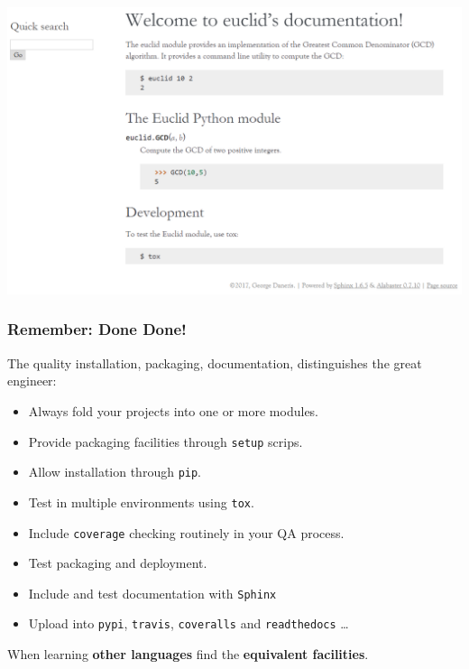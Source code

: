 \documentclass{beamer} %
\newcommand\emc[1]{\textcolor{brightblue}{\textbf{#1}}}
\begin{document}
\begin{frame}

\begin{center}
\includegraphics[scale=0.5]{assets/docs}
\end{center}

\end{frame}


\begin{frame}

\frametitle{Remember: Done Done!}

The quality installation, packaging, documentation, distinguishes the great engineer:
\begin{itemize}
  \item Always fold your projects into one or more modules.
  \item Provide packaging facilities through \texttt{setup} scrips.
  \item Allow installation through \texttt{pip}.
  \item Test in multiple environments using \texttt{tox}.
  \item Include \texttt{coverage} checking routinely in your QA process.
  \item Test packaging and deployment.
  \item Include and test documentation with \texttt{Sphinx}
  \item Upload into \texttt{pypi}, \texttt{travis}, \texttt{coveralls} and \texttt{readthedocs} \ldots
\end{itemize}

\vspace{3mm}
When learning \emc{other languages} find the \emc{equivalent facilities}.

\end{frame}
\end{document}
